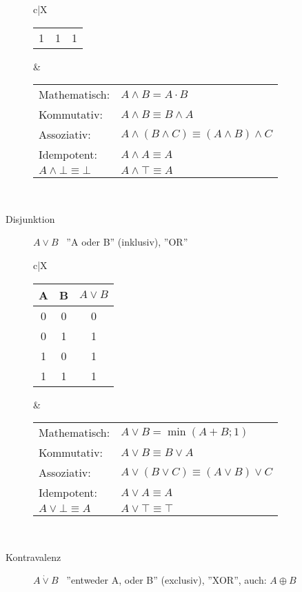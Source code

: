 \begin{description}
\begin{description}
\begin{tabularx}{\linewidth}{c|X}
\begin{tabular}[t]{c|c||c}
                1 & 1 & 1
            \end{tabular} &
            \begin{tabular}[t]{ll}
                Mathematisch:               & $A \wedge B = A \cdot B$                             \\
                Kommutativ:                 & $A \wedge B \equiv B \wedge A$                       \\
                Assoziativ:                 & $A \wedge (B \wedge C) \equiv (A \wedge B) \wedge C$ \\
                Idempotent:                 & $A \wedge A \equiv A$                                \\
                $A \wedge \bot \equiv \bot$ & $A \wedge \top \equiv A$
            \end{tabular} \\ \hline
        \end{tabularx}
        \item[Disjunktion] $A\vee B$ \, ''A oder B'' (inklusiv), ''OR'' \\
        \begin{tabularx}{\linewidth}{c|X}
            \begin{tabular}[t]{c|c||c}
                A & B & $A \vee B$ \\ \hline\hline
                0 & 0 & 0          \\ \hline
                0 & 1 & 1          \\ \hline
                1 & 0 & 1          \\ \hline
                1 & 1 & 1
            \end{tabular} &
            \begin{tabular}[t]{ll}
                Mathematisch:           & $A \vee B = \min(A+B;1)$                     \\
                Kommutativ:             & $A \vee B \equiv B \vee A$                   \\
                Assoziativ:             & $A \vee (B \vee C) \equiv (A \vee B) \vee C$ \\
                Idempotent:             & $A \vee A \equiv A$                          \\
                $A \vee \bot \equiv A $ & $A \vee \top \equiv \top$
            \end{tabular} \\ \hline
        \end{tabularx}
        \item[Kontravalenz] $A\dot{\vee}B$ \, ''entweder A, oder B'' (exclusiv), ''XOR'', auch: $A\oplus B$ \\

\end{description}
\end{description}
